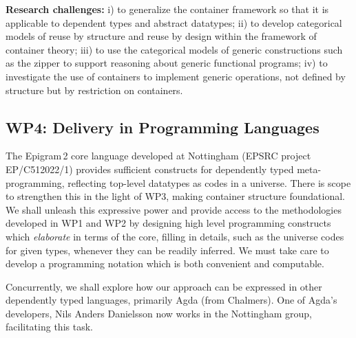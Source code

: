 \documentclass[a4paper]{article}
\begin{document}
\textbf{Research challenges:} i) to generalize the container framework
so that it is applicable to dependent types and abstract datatypes;
ii) to develop categorical models of reuse by structure and reuse by
design within the framework of container theory; iii) to use the
categorical models of generic constructions such as the zipper to
support reasoning about generic functional programs; iv) to
investigate the use of containers to implement generic operations, not
defined by structure but by restriction on containers.







\subsection*{WP4: Delivery in Programming Languages}
\label{sec:development-tools}

The Epigram\,2 core language developed
\cite{morris:ecce,alti:ott-conf} at Nottingham (EPSRC project
EP/C512022/1) provides sufficient constructs for dependently typed
meta-programming, reflecting top-level datatypes as codes in a
universe. There is scope to strengthen this in the light of WP3,
making container structure foundational. We shall unleash this
expressive power and provide access to the methodologies developed in
WP1 and WP2 by designing high level programming constructs which
\emph{elaborate} in terms of the core, filling in details, such as the
universe codes for given types, whenever they can be readily
inferred. We must take care to develop a programming notation which is
both convenient and computable.

Concurrently, we shall explore how our approach can be expressed in
other dependently typed languages, primarily Agda (from Chalmers). One
of Agda's developers, Nils Anders Danielsson now works in the
Nottingham group, facilitating this task.
\end{document}
